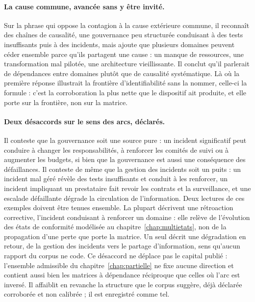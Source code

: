 \paragraph{La cause commune, avancée sans y être invité.} Sur la phrase qui oppose la contagion à
la cause extérieure commune, il reconnaît des chaînes de causalité, une gouvernance peu
structurée conduisant à des tests insuffisants puis à des incidents, mais ajoute que plusieurs
domaines peuvent céder ensemble parce qu'ils partagent une cause : un manque de ressources, une
transformation mal pilotée, une architecture vieillissante. Il conclut qu'il parlerait de
dépendances entre domaines plutôt que de causalité systématique. Là où la première réponse
illustrait la frontière d'identifiabilité sans la nommer, celle-ci la formule : c'est la
corroboration la plus nette que le dispositif ait produite, et elle porte sur la frontière, non
sur la matrice.

\paragraph{Deux désaccords sur le sens des arcs, déclarés.} Il conteste que la gouvernance soit une
source pure : un incident significatif peut conduire à changer les responsabilités, à renforcer
les comités de suivi ou à augmenter les budgets, si bien que la gouvernance est aussi une
conséquence des défaillances. Il conteste de même que la gestion des incidents soit un puits : un
incident mal géré révèle des tests insuffisants et conduit à les renforcer, un incident impliquant
un prestataire fait revoir les contrats et la surveillance, et une escalade défaillante dégrade la
circulation de l'information. Deux lectures de ces exemples doivent être tenues ensemble. La
plupart décrivent une rétroaction corrective, l'incident conduisant à renforcer un domaine :
elle relève de l'évolution des états de conformité modélisée au chapitre~\ref{chap:multietats},
non de la propagation d'une perte que porte la matrice. Un seul décrit une dégradation en retour,
de la gestion des incidents vers le partage d'information, sens qu'aucun rapport du corpus ne
code. Ce désaccord ne déplace pas le capital publié : l'ensemble admissible du
chapitre~\ref{chap:partielle} ne fixe aucune direction et contient aussi bien les matrices à
dépendance réciproque que celles où l'arc est inversé. Il affaiblit en revanche la structure que
le corpus suggère, déjà déclarée corroborée et non calibrée ; il est enregistré comme tel.

